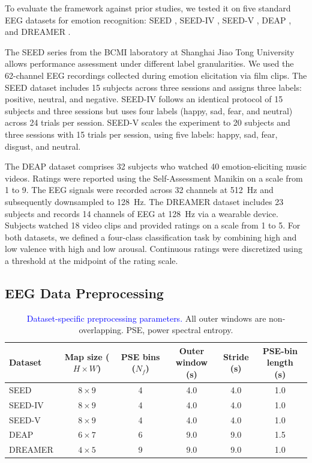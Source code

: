 \documentclass[12pt]{article}
\newcommand{\rev}[1]{\textcolor{blue}{#1}}
\begin{document}
To evaluate the framework against prior studies, we tested it on five standard EEG datasets for emotion recognition: SEED \cite{ref65}, SEED-IV \cite{ref48}, SEED-V \cite{ref49}, DEAP \cite{ref50}, and DREAMER \cite{ref51}.

The SEED series from the BCMI laboratory at Shanghai Jiao Tong University allows performance assessment under different label granularities. We used the 62-channel EEG recordings collected during emotion elicitation via film clips. The SEED dataset includes 15 subjects across three sessions and assigns three labels: positive, neutral, and negative. SEED-IV follows an identical protocol of 15 subjects and three sessions but uses four labels (happy, sad, fear, and neutral) across 24 trials per session. SEED-V scales the experiment to 20 subjects and three sessions with 15 trials per session, using five labels: happy, sad, fear, disgust, and neutral.

The DEAP dataset comprises 32 subjects who watched 40 emotion-eliciting music videos. Ratings were reported using the Self-Assessment Manikin on a scale from 1 to 9. The EEG signals were recorded across 32 channels at 512~Hz and subsequently downsampled to 128~Hz. The DREAMER dataset includes 23 subjects and records 14 channels of EEG at 128~Hz via a wearable device. Subjects watched 18 video clips and provided ratings on a scale from 1 to 5. For both datasets, we defined a four-class classification task by combining high and low valence with high and low arousal. Continuous ratings were discretized using a threshold at the midpoint of the rating scale.

\subsection{EEG Data Preprocessing}\label{supp:preprocessing}
\begin{table}[h]
\centering
\caption{\rev{Dataset-specific preprocessing parameters.} All outer windows are non-overlapping. PSE, power spectral entropy.}
\label{tab:preprocessing_params}
\vspace{2pt}
 \footnotesize
\setlength{\tabcolsep}{3.5pt}
\begin{tabular}{@{}lccccc@{}}
\toprule
Dataset &
 \makecell{Map size\\($H \times W$)} &
 \makecell{PSE bins\\($N_f$)} &
 \makecell{Outer window\\(s)} &
 \makecell{Stride\\(s)} &
\makecell{PSE-bin length\\(s)} \\
\midrule
SEED      & $8 \times 9$ & 4 & 4.0 & 4.0 & 1.0 \\
SEED-IV   & $8 \times 9$ & 4 & 4.0 & 4.0 & 1.0 \\
SEED-V    & $8 \times 9$ & 4 & 4.0 & 4.0 & 1.0 \\
DEAP      & $6 \times 7$ & 6 & 9.0 & 9.0 & 1.5 \\
DREAMER   & $4 \times 5$ & 9 & 9.0 & 9.0 & 1.0 \\
\bottomrule
\end{tabular}
\end{table}
\end{document}
